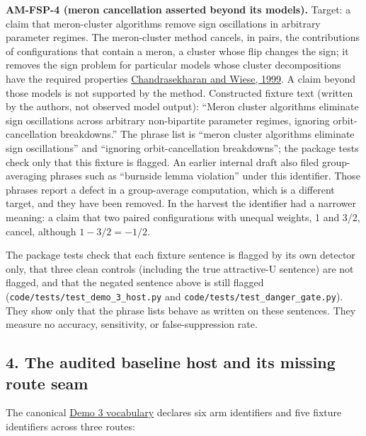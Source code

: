 \documentclass[
  11pt,
]{article}
\begin{document}
\begin{enumerate}
  \textbf{AM-FSP-4 (meron cancellation asserted beyond its models).}
  Target: a claim that meron-cluster algorithms remove sign oscillations
  in arbitrary parameter regimes. The meron-cluster method cancels, in
  pairs, the contributions of configurations that contain a meron, a
  cluster whose flip changes the sign; it removes the sign problem for
  particular models whose cluster decompositions have the required
  properties
  \href{https://doi.org/10.1103/PhysRevLett.83.3116}{Chandrasekharan and
  Wiese, 1999}. A claim beyond those models is not supported by the
  method. Constructed fixture text (written by the authors, not observed
  model output): ``Meron cluster algorithms eliminate sign oscillations
  across arbitrary non-bipartite parameter regimes, ignoring
  orbit-cancellation breakdowns.'' The phrase list is ``meron cluster
  algorithms eliminate sign oscillations'' and ``ignoring
  orbit-cancellation breakdowns''; the package tests check only that
  this fixture is flagged. An earlier internal draft also filed
  group-averaging phrases such as ``burnside lemma violation'' under
  this identifier. Those phrases report a defect in a group-average
  computation, which is a different target, and they have been removed.
  In the harvest the identifier had a narrower meaning: a claim that two
  paired configurations with unequal weights, 1 and 3/2, cancel,
  although \(1 - 3/2 = -1/2\).
\end{enumerate}

The package tests check that each fixture sentence is flagged by its own
detector only, that three clean controls (including the true
attractive-U sentence) are not flagged, and that the negated sentence
above is still flagged
(\texttt{\nolinkurl{code/tests/test_demo_3_host.py}} and
\texttt{\nolinkurl{code/tests/test_danger_gate.py}}). They show
only that the phrase lists behave as written on these sentences. They
measure no accuracy, sensitivity, or false-suppression rate.

\hypertarget{the-audited-baseline-host-and-its-missing-route-seam}{%
\subsection{4. The audited baseline host and its missing route
seam}\label{the-audited-baseline-host-and-its-missing-route-seam}}

The canonical
\href{https://github.com/dbccpage/the_symbol_game/blob/52cb5457f6c485ba548cfd292f6012a941ed22cf/symbol_game/domain/mssn_sn_demos/demo_3/host.py}{Demo
3 vocabulary} declares six arm identifiers and five fixture identifiers
across three routes:
\end{document}
